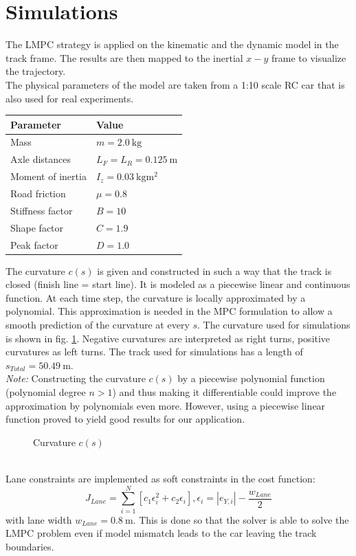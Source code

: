 \section{Simulations}
The LMPC strategy is applied on the kinematic and the dynamic model in the track frame. The results are then mapped to the inertial $x-y$ frame to visualize the trajectory.\\
The physical parameters of the model are taken from a 1:10 scale RC car that is also used for real experiments.

\begin{center}
\begin{tabular}{l|l}
Parameter & Value\\
\hline
Mass& $m=\SI{2.0}{\kilo\gram}$\\
Axle distances&$L_F=L_R = \SI{0.125}{\meter}$\\
Moment of inertia&$I_z = \SI{0.03}{\kilo\gram\square\meter}$\\
Road friction&$\mu = 0.8$\\
Stiffness factor & $B=10$\\ 
Shape factor & $C=1.9$\\
Peak factor & $D=1.0$
\end{tabular}
\end{center}
The curvature $c(s)$ is given and constructed in such a way that the track is closed (finish line = start line). It is modeled as a piecewise linear and continuous function. At each time step, the curvature is locally approximated by a polynomial. This approximation is needed in the MPC formulation to allow a smooth prediction of the curvature at every $s$. The curvature used for simulations is shown in fig. \ref{fig:Sim_curv}. Negative curvatures are interpreted as right turns, positive curvatures as left turns. The track used for simulations has a length of $s_{Total} = \SI{50.49}{\meter}$.\\
\emph{Note:} Constructing the curvature $c(s)$ by a piecewise polynomial function (polynomial degree $n>1$) and thus making it differentiable could improve the approximation by polynomials even more. However, using a piecewise linear function proved to yield good results for our application.
\begin{figure}[ht]
	\centering
  	
  	\caption{Curvature $c(s)$}
	\label{fig:Sim_curv}
\end{figure}
\\Lane constraints are implemented as soft constraints in the cost function: %
\begin{equation}\label{eq:softLaneConstraints}
J_{Lane} = \sum_{i=1}^N [c_1\epsilon_i^2 + c_2\epsilon_i], \epsilon_i = |e_{Y,i}|-\frac{w_{Lane}}{2}
\end{equation}
with lane width $w_{Lane}=\SI{0.8}{\meter}$. This is done so that the solver is able to solve the LMPC problem even if model mismatch leads to the car leaving the track boundaries.
